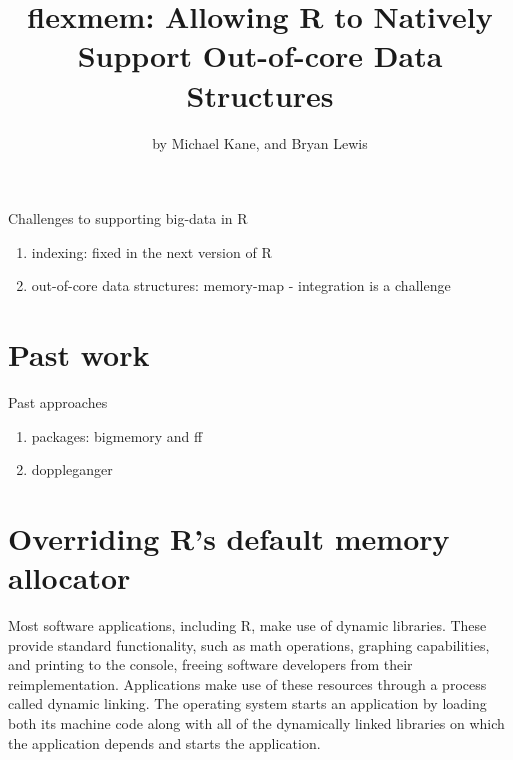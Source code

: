 \title{flexmem: Allowing R to Natively Support Out-of-core Data Structures}
\author{by Michael Kane, and Bryan Lewis}

\maketitle




Challenges to supporting big-data in R
\begin{enumerate}
  \item indexing: fixed in the next version of R
  \item out-of-core data structures: memory-map - integration is a challenge
\end{enumerate}

\section{Past work}

Past approaches
\begin{enumerate}
  \item packages: bigmemory and ff
  \item doppleganger
\end{enumerate}



\section{Overriding R's default memory allocator}

Most software applications, including R, make use of dynamic
libraries. These provide standard functionality, such as math operations,
graphing capabilities, and printing to the console, freeing software developers 
from their reimplementation. Applications make use of these resources through
a process called dynamic linking.  The operating
system starts an application by loading both its machine code along with
all of the dynamically linked libraries on which the application depends and 
starts the application.

